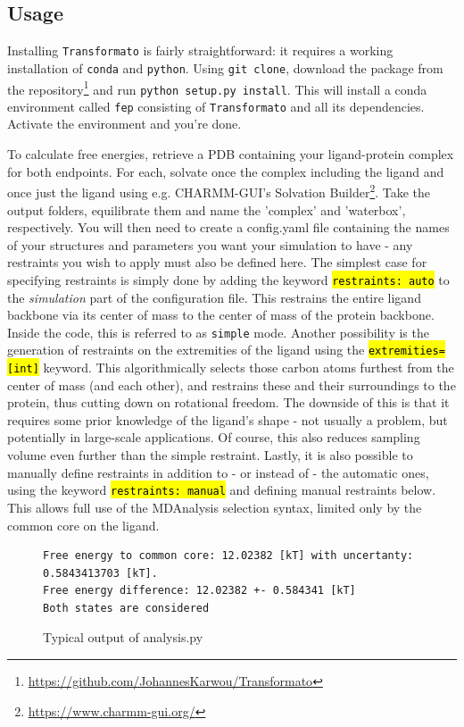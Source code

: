 \documentclass[oneside]{scrreprt}
\newcommand{\code}[1]{\texttt{\hl{#1}}}
\begin{document}
\subsection{Usage}
Installing \texttt{Transformato} is fairly straightforward: it requires a working installation of \texttt{conda} and \texttt{python}. Using \texttt{git clone}, download the package from the repository\footnote{\url{https://github.com/JohannesKarwou/Transformato}} and run \texttt{python setup.py install}. This will install a conda environment called \texttt{fep} consisting of \texttt{Transformato} and all its dependencies. Activate the environment and you're done.

To calculate free energies, retrieve a PDB containing your ligand-protein complex for both endpoints. For each, solvate once the complex including the ligand and once just the ligand using e.g. CHARMM-GUI's Solvation Builder\footnote{\url{https://www.charmm-gui.org/}}. Take the output folders, equilibrate them and name the 'complex' and 'waterbox', respectively. You will then need to create a config.yaml file containing the names of your structures and parameters you want your simulation to have - any restraints you wish to apply must also be defined here. The simplest case for specifying restraints is simply done by adding the keyword \code{restraints: auto} to the \emph{simulation} part of the configuration file. This restrains the entire ligand backbone via its center of mass to the center of mass of the protein backbone. Inside the code, this is referred to as \texttt{simple} mode. Another possibility is the generation of restraints on the extremities of the ligand using the \code{extremities=[int]} keyword. This algorithmically selects those carbon atoms furthest from the center of mass (and each other), and restrains these and their surroundings to the protein, thus cutting down on rotational freedom. The downside of this is that it requires some prior knowledge of the ligand's shape - not usually a problem, but potentially in large-scale applications. Of course, this also reduces sampling volume even further than the simple restraint. Lastly, it is also possible to manually define restraints in addition to - or instead of - the automatic ones, using the keyword \code{restraints: manual} and defining manual restraints below. This allows full use of the MDAnalysis\cite{agrawal2011,oliver_beckstein-proc-scipy-2016} selection syntax, limited only by the common core on the ligand.

\begin{figure}[h]\small

\begin{verbatim}
Free energy to common core: 12.02382 [kT] with uncertanty: 0.5843413703 [kT].
Free energy difference: 12.02382 +- 0.584341 [kT]
Both states are considered
\end{verbatim}
\label{fig:anaoutput}
\caption{Typical output of analysis.py}
\end{figure}
\end{document}

